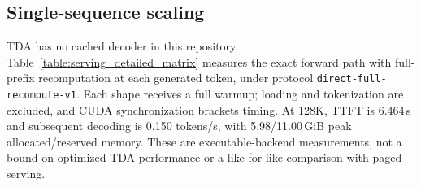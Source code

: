 \begin{landscape}
\subsection{Single-sequence scaling}
TDA has no cached decoder in this repository. Table~\ref{table:serving_detailed_matrix} measures the exact forward path with full-prefix recomputation at each generated token, under protocol \texttt{direct-full-recompute-v1}. Each shape receives a full warmup; loading and tokenization are excluded, and CUDA synchronization brackets timing. At 128K, TTFT is 6.464\,s and subsequent decoding is 0.150 tokens/s, with 5.98/11.00\,GiB peak allocated/reserved memory. These are executable-backend measurements, not a bound on optimized TDA performance or a like-for-like comparison with paged serving.


\end{landscape}
